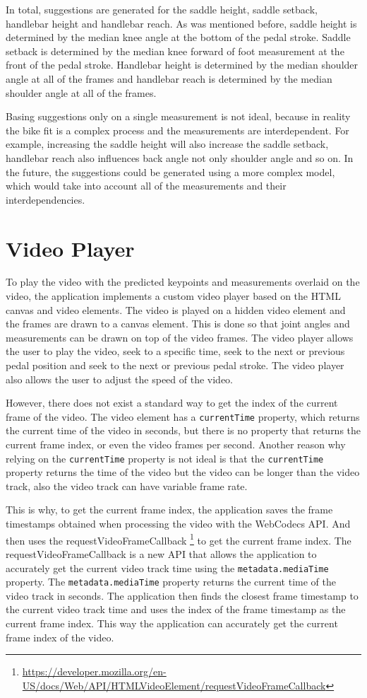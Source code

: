 In total, suggestions are generated for the saddle height, saddle setback, handlebar height and handlebar reach. As was mentioned before, saddle height is determined by the median knee angle at the bottom of the pedal stroke. Saddle setback is determined by the median knee forward of foot measurement at the front of the pedal stroke. Handlebar height is determined by the median shoulder angle at all of the frames and handlebar reach is determined by the median shoulder angle at all of the frames.

Basing suggestions only on a single measurement is not ideal, because in reality the bike fit is a complex process and the measurements are interdependent. For example, increasing the saddle height will also increase the saddle setback, handlebar reach also influences back angle not only shoulder angle and so on. In the future, the suggestions could be generated using a more complex model, which would take into account all of the measurements and their interdependencies.
\section{Video Player}
\label{video_player}
To play the video with the predicted keypoints and measurements overlaid on the video, the application implements a custom video player based on the HTML canvas and video elements. The video is played on a hidden video element and the frames are drawn to a canvas element. This is done so that joint angles and measurements can be drawn on top of the video frames. The video player allows the user to play the video, seek to a specific time, seek to the next or previous pedal position and seek to the next or previous pedal stroke. The video player also allows the user to adjust the speed of the video.

However, there does not exist a standard way to get the index of the current frame of the video. The video element has a \texttt{currentTime} property, which returns the current time of the video in seconds, but there is no property that returns the current frame index, or even the video frames per second. Another reason why relying on the \texttt{currentTime} property is not ideal is that the \texttt{currentTime} property returns the time of the video but the video can be longer than the video track, also the video track can have variable frame rate.

This is why, to get the current frame index, the application saves the frame timestamps obtained when processing the video with the WebCodecs API. And then uses the requestVideoFrameCallback \footnote{\url{https://developer.mozilla.org/en-US/docs/Web/API/HTMLVideoElement/requestVideoFrameCallback}} to get the current frame index. The requestVideoFrameCallback is a new API that allows the application to accurately get the current video track time using the \texttt{metadata.mediaTime} property. The \texttt{metadata.mediaTime} property returns the current time of the video track in seconds. The application then finds the closest frame timestamp to the current video track time and uses the index of the frame timestamp as the current frame index. This way the application can accurately get the current frame index of the video.


